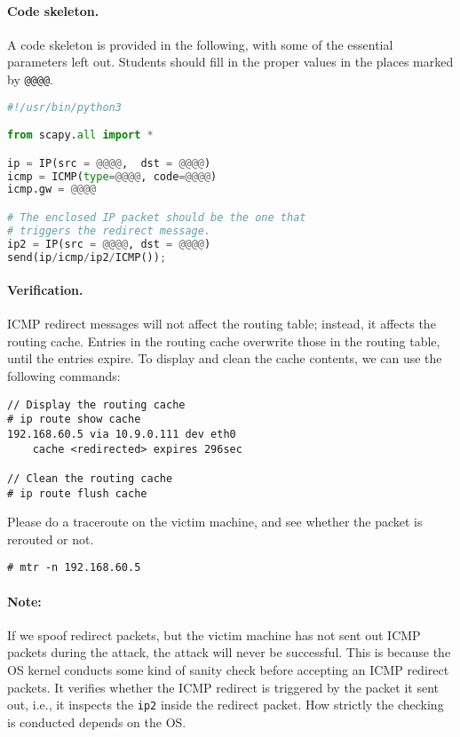 \paragraph{Code skeleton.} A code skeleton is provided in the following, with
some of the essential parameters left out. Students should fill in the proper 
values in the places marked by \texttt{@@@@}.  


\begin{lstlisting}[language=python]
#!/usr/bin/python3

from scapy.all import *

ip = IP(src = @@@@,  dst = @@@@)
icmp = ICMP(type=@@@@, code=@@@@)
icmp.gw = @@@@

# The enclosed IP packet should be the one that 
# triggers the redirect message. 
ip2 = IP(src = @@@@, dst = @@@@)
send(ip/icmp/ip2/ICMP());
\end{lstlisting}
 

\paragraph{Verification.}
ICMP redirect messages will not affect the routing table; instead, it 
affects the routing cache. Entries in the routing cache overwrite 
those in the routing table, until the entries expire. To display 
and clean the cache contents, we can use the following commands: 

\begin{lstlisting}
// Display the routing cache 
# ip route show cache
192.168.60.5 via 10.9.0.111 dev eth0
    cache <redirected> expires 296sec

// Clean the routing cache
# ip route flush cache
\end{lstlisting}


Please do a traceroute on the victim machine, and see whether the packet
is rerouted or not. 

\begin{lstlisting}
# mtr -n 192.168.60.5
\end{lstlisting}
 

\paragraph{Note:}
If we spoof redirect packets, but the victim machine has not 
sent out ICMP packets during the attack, the attack will never be successful. 
This is because the OS kernel conducts some kind of 
sanity check before accepting an ICMP redirect packets. 
It verifies whether the ICMP redirect is triggered by 
the packet it sent out, i.e., it inspects 
the \texttt{ip2} inside the redirect packet. 
How strictly the checking is conducted 
depends on the OS. 

